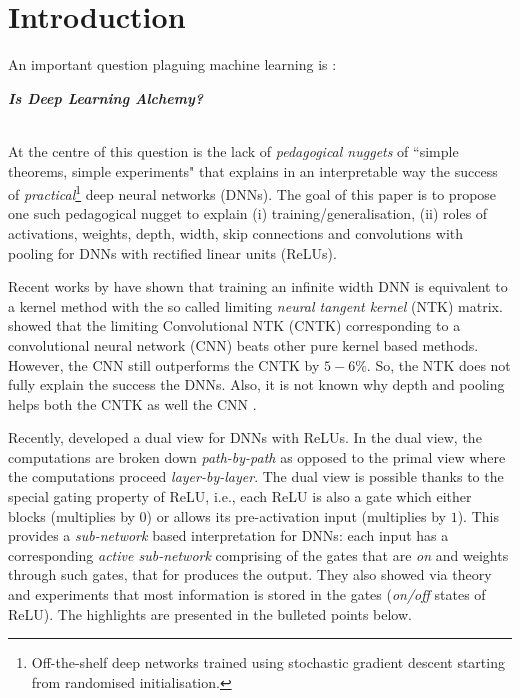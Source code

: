 \section{Introduction}\label{sec:intro}
An important question plaguing machine learning is \citet{BenAli-1,Lecun,BenAli-2,Aliresponse,Mickens}:\\
{\centerline{\textbf{\emph{Is Deep Learning Alchemy?}}}}\\
At the centre of this question is the lack of \emph{pedagogical nuggets} of ``simple theorems, simple experiments" \citet{Aliresponse} that explains in an interpretable way the success of \emph{practical}\footnote{Off-the-shelf deep networks trained using stochastic gradient descent starting from randomised initialisation.} deep neural networks (DNNs). The goal of this paper is to propose one such pedagogical nugget to explain (i) training/generalisation, (ii) roles of activations, weights, depth, width, skip connections and convolutions with pooling for DNNs with rectified linear units (ReLUs). %

Recent works by \citet{arora2019exact, ntk,cao2019generalization} have shown that training an infinite width DNN is equivalent to a kernel method with the so called limiting \emph{neural tangent kernel} (NTK) matrix. \citet{arora2019exact} showed that the limiting Convolutional NTK (CNTK) corresponding to a convolutional neural network (CNN) beats other pure kernel based methods. However, the CNN still outperforms the CNTK by $5-6\%$. So, the NTK does not fully explain the success the DNNs. Also, it is not known why depth and pooling helps both the CNTK as well the CNN \citet{arora2019exact}.

Recently, \citet{npk} developed a dual view for DNNs with ReLUs. In the dual view, the computations are broken down \emph{path-by-path} as opposed to the primal view where the computations proceed \emph{layer-by-layer}. The dual view is possible thanks to the special gating property of ReLU, i.e., each ReLU is also a gate which either blocks (multiplies by $0$) or allows its pre-activation input (multiplies by $1$). This provides a \emph{sub-network} based interpretation for DNNs: each input has a corresponding \emph{active sub-network} comprising of the gates that are \emph{on} and weights through such gates, that for produces the output. They also showed via theory and experiments that most information is stored in the gates (\emph{on/off} states of ReLU). The highlights are presented in the bulleted points below.

